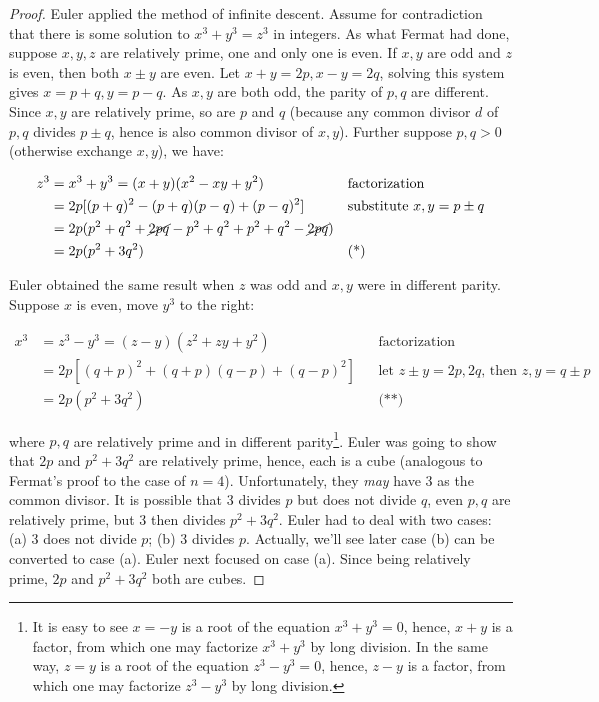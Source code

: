 \documentclass[b5paper]{article}
\begin{document}
\begin{proof}
Euler applied the method of infinite descent. Assume for contradiction that there is some solution to $x^3 + y^3 = z^3$ in integers. As what Fermat had done, suppose $x, y, z$ are relatively prime, one and only one is even. If $x, y$ are odd and $z$ is even, then both $x \pm y$ are even. Let $x + y = 2p, x - y = 2q$, solving this system gives $x = p + q, y = p - q$. As $x, y$ are both odd, the parity of $p, q$ are different. Since $x, y$ are relatively prime, so are $p$ and $q$ (because any common divisor $d$ of $p, q$ divides $p \pm q$, hence is also common divisor of $x, y$). Further suppose $p, q > 0$ (otherwise exchange $x, y$), we have:

\begin{align*}
z^3 &= x^3 + y^3 = (x + y)(x^2 - xy + y^2) && \text{factorization} \\
  &= 2p[(p + q)^2 - (p + q)(p - q) + (p - q)^2] && \text{substitute }x, y = p \pm q \\
  &= 2p(p^2 + q^2 + \cancel{2pq} - p^2 + q^2 + p^2 + q^2 - \cancel{2pq}) \\
  &= 2p(p^2 + 3q^2) && \text{(*)}
\end{align*}

Euler obtained the same result when $z$ was odd and $x, y$ were in different parity. Suppose $x$ is even, move $y^3$ to the right:

\begin{align*}
x^3 &= z^3 - y^3 = (z - y)(z^2 + zy + y^2) && \text{factorization} \\
  &= 2p[(q + p)^2 + (q + p)(q - p) + (q - p)^2] && \text{let }z \pm y = 2p, 2q \text{, then }z, y = q \pm p \\
  &= 2p(p^2 + 3q^2) && \text{(**)}
\end{align*}

where $p, q$ are relatively prime and in different parity\footnote{It is easy to see $x = -y$ is a root of the equation $x^3+ y^3 = 0$, hence, $x + y$ is a factor, from which one may factorize $x^3 + y^3$ by long division. In the same way, $z = y$ is a root of the equation $z^3 - y^3 = 0$, hence, $z - y$ is a factor, from which one may factorize $z^3 - y^3$ by long division.}. Euler was going to show that $2p$ and $p^2 + 3q^2$ are relatively prime, hence, each is a cube (analogous to Fermat's proof to the case of $n = 4$). Unfortunately, they \emph{may} have 3 as the common divisor. It is possible that 3 divides $p$ but does not divide $q$, even $p, q$ are relatively prime, but 3 then divides $p^2 + 3q^2$. Euler had to deal with two cases: (a) 3 does not divide $p$; (b) 3 divides $p$. Actually, we'll see later case (b) can be converted to case (a). Euler next focused on case (a). Since being relatively prime, $2p$ and $p^2 + 3q^2$ both are cubes.


\end{proof}
\end{document}
